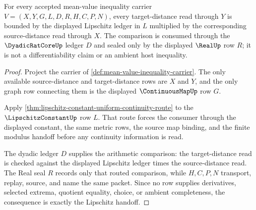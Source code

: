 \begin{theorem}
\label{thm:mean-value-inequality-lipschitz-handoff}
For every accepted mean-value inequality carrier
$V=(X,Y,G,L,D,R,H,C,P,N)$, every target-distance read through $Y$ is bounded by
the displayed Lipschitz ledger in $L$ multiplied by the corresponding
source-distance read through $X$. The comparison is consumed through the
$\DyadicRatCoreUp$ ledger $D$ and sealed only by the displayed $\RealUp$ row
$R$; it is not a differentiability claim or an ambient host inequality.
\end{theorem}
\begin{proof}
Project the carrier of \autoref{def:mean-value-inequality-carrier}. The only
available source-distance and target-distance rows are $X$ and $Y$, and the
only graph row connecting them is the displayed $\ContinuousMapUp$ row $G$.

Apply \autoref{thm:lipschitz-constant-uniform-continuity-route} to the
$\LipschitzConstantUp$ row $L$. That route forces the consumer through the
displayed constant, the same metric rows, the source map binding, and the
finite modulus handoff before any continuity information is read.

The dyadic ledger $D$ supplies the arithmetic comparison: the target-distance
read is checked against the displayed Lipschitz ledger times the
source-distance read. The Real seal $R$ records only that routed comparison,
while $H,C,P,N$ transport, replay, source, and name the same packet. Since no
row supplies derivatives, selected extrema, quotient equality, choice, or
ambient completeness, the consequence is exactly the Lipschitz handoff.
\end{proof}




